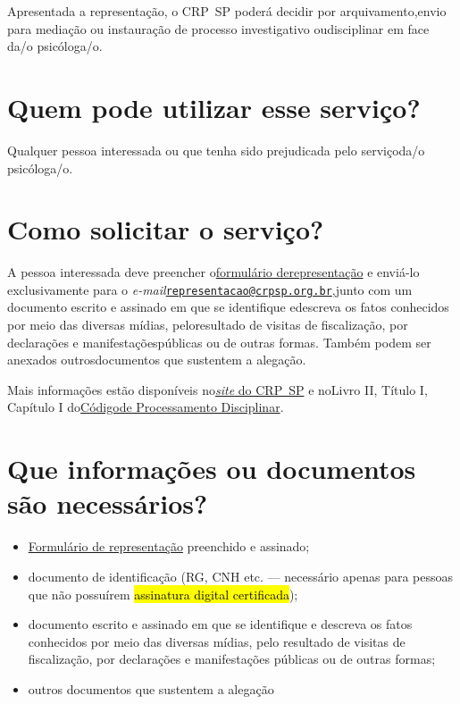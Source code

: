 Apresentada a representação, o CRP~SP poderá decidir por arquivamento,envio para mediação ou instauração de processo investigativo oudisciplinar em face da/o psicóloga/o.

\section{Quem pode utilizar esse serviço?}

Qualquer pessoa interessada ou que tenha sido prejudicada pelo serviçoda/o psicóloga/o.

\section{Como solicitar o serviço?}

A pessoa interessada deve preencher o\hyperref[]{formulário derepresentação} e enviá-lo exclusivamente para o \emph{e-mail}\href{mailto:representacao@crpsp.org.br}{\nolinkurl{representacao@crpsp.org.br}},junto com um documento escrito e assinado em que se identifique edescreva os fatos conhecidos por meio das diversas mídias, peloresultado de visitas de fiscalização, por declarações e manifestaçõespúblicas ou de outras formas. Também podem ser anexados outrosdocumentos que sustentem a alegação.

Mais informações estão disponíveis no\href{https://www.crpsp.org/pagina/view/50}{\emph{site} do CRP~SP} e noLivro II, Título I, Capítulo I do\href{https://atosoficiais.com.br/cfp/resolucao-de-fiscalizacao-e-orientacao-n-11-2019-institui-o-codigo-de-processamento-disciplinar?origin=instituicao&q=011/2019}{Códigode Processamento Disciplinar}.

\section{Que informações ou documentos são necessários?}

\begin{itemize}
  \item  \hyperref[]{Formulário de  representação} preenchido e assinado;
  \item  documento de identificação (RG, CNH etc. --- necessário apenas para  pessoas que não possuírem \hl{assinatura digital certificada});
  \item  documento escrito e assinado em que se identifique e descreva os fatos  conhecidos por meio das diversas mídias, pelo resultado de visitas de  fiscalização, por declarações e manifestações públicas ou de outras  formas;
  \item  outros documentos que sustentem a alegação
\end{itemize}

